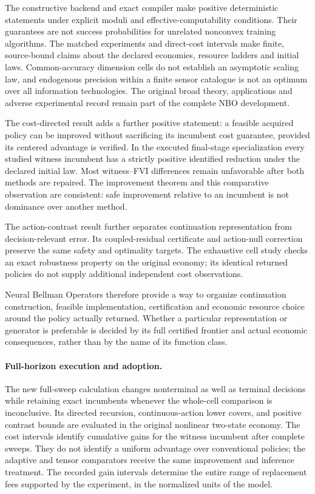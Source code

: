 \documentclass[ecta,nameyear,draft]{econsocart}
\begin{document}
The constructive backend and exact compiler make positive deterministic statements under explicit moduli and effective-computability conditions. Their guarantees are not success probabilities for unrelated nonconvex training algorithms. The matched experiments and direct-cost intervals make finite, source-bound claims about the declared economies, resource ladders and initial laws. Common-accuracy dimension cells do not establish an asymptotic scaling law, and endogenous precision within a finite sensor catalogue is not an optimum over all information technologies. The original broad theory, applications and adverse experimental record remain part of the complete NBO development.

The cost-directed result adds a further positive statement: a feasible acquired policy can be improved without sacrificing its incumbent cost guarantee, provided its centered advantage is verified. In the executed final-stage specialization every studied witness incumbent has a strictly positive identified reduction under the declared initial law. Most witness--FVI differences remain unfavorable after both methods are repaired. The improvement theorem and this comparative observation are consistent: safe improvement relative to an incumbent is not dominance over another method.

The action-contrast result further separates continuation representation from decision-relevant error. Its coupled-residual certificate and action-null correction preserve the same safety and optimality targets. The exhaustive cell study checks an exact robustness property on the original economy; its identical returned policies do not supply additional independent cost observations.

Neural Bellman Operators therefore provide a way to organize continuation construction, feasible implementation, certification and economic resource choice around the policy actually returned. Whether a particular representation or generator is preferable is decided by its full certified frontier and actual economic consequences, rather than by the name of its function class.

\paragraph{Full-horizon execution and adoption.}
The new full-sweep calculation changes nonterminal as well as terminal decisions while retaining exact incumbents whenever the whole-cell comparison is inconclusive. Its directed recursion, continuous-action lower covers, and positive contrast bounds are evaluated in the original nonlinear two-state economy. The cost intervals identify cumulative gains for the witness incumbent after complete sweeps. They do not identify a uniform advantage over conventional policies; the adaptive and tensor comparators receive the same improvement and inference treatment. The recorded gain intervals determine the entire range of replacement fees supported by the experiment, in the normalized units of the model.
\end{document}
